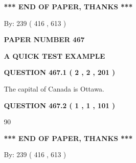\documentclass[12pt]{article}
\begin{document}
   
   
   
   
\vspace{1.0in} 
{\textbf{\large{ *** END OF PAPER, THANKS *** }}} 
   
   
\hspace{1.0in} By: 
 239 ( 416 ,  613 )
   
   
   
   
\newpage 
\setcounter{page}{ 
   467001 } 
   
   
   
   
 {\textbf{ \Large{ PAPER NUMBER  467  }}}
   
   
\vspace{0.2in}
   
   
   
   
   
   
 \vspace{0.2in}
{\LARGE {\textbf{ A QUICK TEST EXAMPLE}}}
   
   
  
\vspace{0.2in}
  
{\textbf{\Large{QUESTION
467.1 
 ( 2 , 2 , 201 )
}}}
  
  
 
 
\noindent{}
 
 
The capital of Canada is Ottawa.
 
 
 
 
  
\vspace{0.2in}
  
{\textbf{\Large{QUESTION
467.2 
 ( 1 , 1 , 101 )
}}}
  
  
 
 
\noindent{}

90
 
 
   
   
 \vspace{0.2in}
 
   
   
   
   
\vspace{1.0in} 
{\textbf{\large{ *** END OF PAPER, THANKS *** }}} 
   
   
\hspace{1.0in} By: 
 239 ( 416 ,  613 )
   
\end{document}
